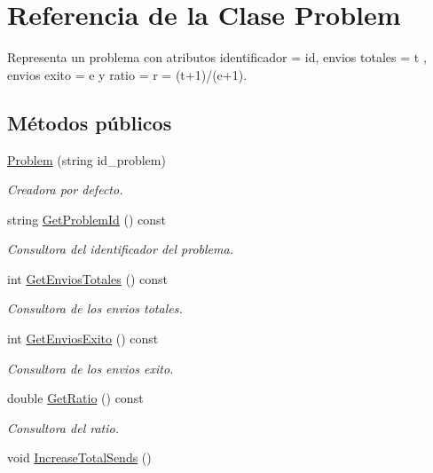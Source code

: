 \hypertarget{class_problem}{}\section{Referencia de la Clase Problem}
\label{class_problem}


Representa un problema con atributos identificador = id, envios totales = t , envios exito = e y ratio = r = (t+1)/(e+1).  


\subsection*{Métodos públicos}
\begin{DoxyCompactItemize}
\item 
\mbox{\hyperlink{class_problem_a5f33ca7fa33e9056b5d392daa276809c}{Problem}} (string id\+\_\+problem)
\begin{DoxyCompactList}\small\item\em Creadora por defecto. \end{DoxyCompactList}\item 
string \mbox{\hyperlink{class_problem_a953ef8047cd489d36f4a96d10baed4af}{Get\+Problem\+Id}} () const
\begin{DoxyCompactList}\small\item\em Consultora del identificador del problema. \end{DoxyCompactList}\item 
int \mbox{\hyperlink{class_problem_af97fede267d1b9881854f7d8da7be49a}{Get\+Envios\+Totales}} () const
\begin{DoxyCompactList}\small\item\em Consultora de los envios totales. \end{DoxyCompactList}\item 
int \mbox{\hyperlink{class_problem_aff1a49d7c06873886905fc01b5ca024c}{Get\+Envios\+Exito}} () const
\begin{DoxyCompactList}\small\item\em Consultora de los envios exito. \end{DoxyCompactList}\item 
double \mbox{\hyperlink{class_problem_a6aceef9e936ee16ef8368803f22a0268}{Get\+Ratio}} () const
\begin{DoxyCompactList}\small\item\em Consultora del ratio. \end{DoxyCompactList}\item 
void \mbox{\hyperlink{class_problem_a8afb8fba991ac36958733992a67c8ed6}{Increase\+Total\+Sends}} ()

\end{DoxyCompactItemize}
